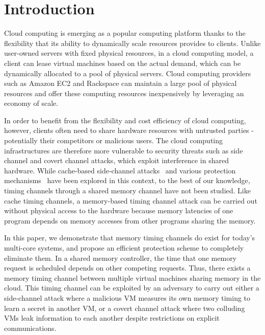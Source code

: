 \section{Introduction}
\label{sec:intro}
\nocite{(*)}

Cloud computing is emerging as a popular computing platform thanks to the
flexibility that its ability to dynamically scale resources provides to clients.
Unlike user-owned servers with fixed physical resources, in a cloud computing model,
a client can lease virtual machines based on the actual demand, which can be 
dynamically allocated to a pool of physical servers.
Cloud computing 
providers such as Amazon EC2 and Rackspace can maintain a large pool of physical
resources and offer these computing resources inexpensively by leveraging 
an economy of scale. 

In order to benefit from the flexibility and cost efficiency of cloud computing,
however, clients often need to share hardware resources with untrusted parties -
potentially their competitors or malicious users. 
The cloud computing infrastructures are therefore more 
vulnerable to security threats such as side channel and covert channel attacks,
which exploit interference in shared hardware. While cache-based 
side-channel attacks~\cite{Percival,Bernstein,amazonattack} and various protection mechanisms~\cite{partitioncache,PLcache,RPcache} have been explored in
this context, to 
the best of our knowledge, timing channels through a shared memory channel have
not been studied.  
Like cache timing channels, a memory-based timing channel attack can be 
carried out without physical access to the hardware because memory latencies
of one program depends on memory accesses from other programs sharing the
memory. 

In this paper, we demonstrate that memory timing channels do exist for today's 
multi-core systems, and propose an efficient protection scheme to completely
eliminate them. In a shared memory controller, the time that one memory request
is scheduled depends on other competing requests. 
Thus, there exists a memory timing channel between multiple virtual machines
sharing memory in the cloud.  This timing channel can be 
exploited by an adversary to carry out either a side-channel attack where a
malicious VM measures its own memory timing to learn a secret in another VM, or
a covert channel attack where two colluding VMs leak information to each 
another despite restrictions on explicit communications.

